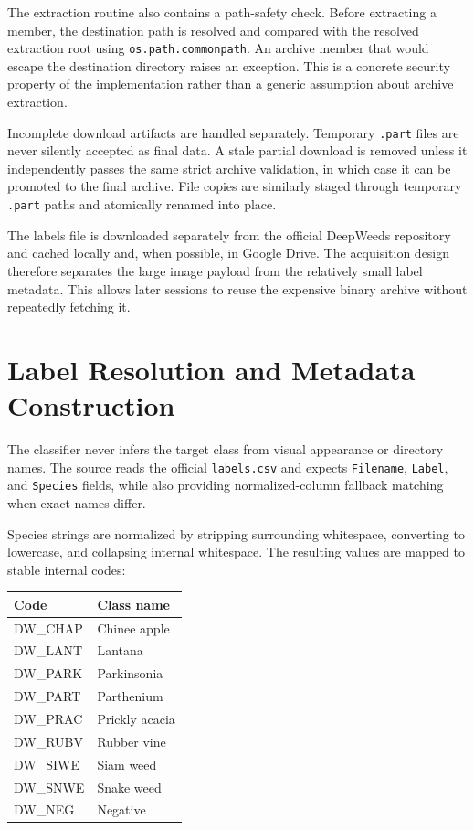 \documentclass[11pt,a4paper]{article}
\begin{document}
The extraction routine also contains a path-safety check. Before extracting a member, the destination path is resolved and compared with the resolved extraction root using \texttt{os.path.commonpath}. An archive member that would escape the destination directory raises an exception. This is a concrete security property of the implementation rather than a generic assumption about archive extraction.

Incomplete download artifacts are handled separately. Temporary \texttt{.part} files are never silently accepted as final data. A stale partial download is removed unless it independently passes the same strict archive validation, in which case it can be promoted to the final archive. File copies are similarly staged through temporary \texttt{.part} paths and atomically renamed into place.

The labels file is downloaded separately from the official DeepWeeds repository and cached locally and, when possible, in Google Drive. The acquisition design therefore separates the large image payload from the relatively small label metadata. This allows later sessions to reuse the expensive binary archive without repeatedly fetching it.

\section{Label Resolution and Metadata Construction}
The classifier never infers the target class from visual appearance or directory names. The source reads the official \texttt{labels.csv} and expects \texttt{Filename}, \texttt{Label}, and \texttt{Species} fields, while also providing normalized-column fallback matching when exact names differ.

Species strings are normalized by stripping surrounding whitespace, converting to lowercase, and collapsing internal whitespace. The resulting values are mapped to stable internal codes:

\begin{center}
\begin{tabular}{ll}
\toprule
Code & Class name \\
\midrule
DW\_CHAP & Chinee apple \\
DW\_LANT & Lantana \\
DW\_PARK & Parkinsonia \\
DW\_PART & Parthenium \\
DW\_PRAC & Prickly acacia \\
DW\_RUBV & Rubber vine \\
DW\_SIWE & Siam weed \\
DW\_SNWE & Snake weed \\
DW\_NEG & Negative \\
\bottomrule
\end{tabular}
\end{center}
\end{document}
